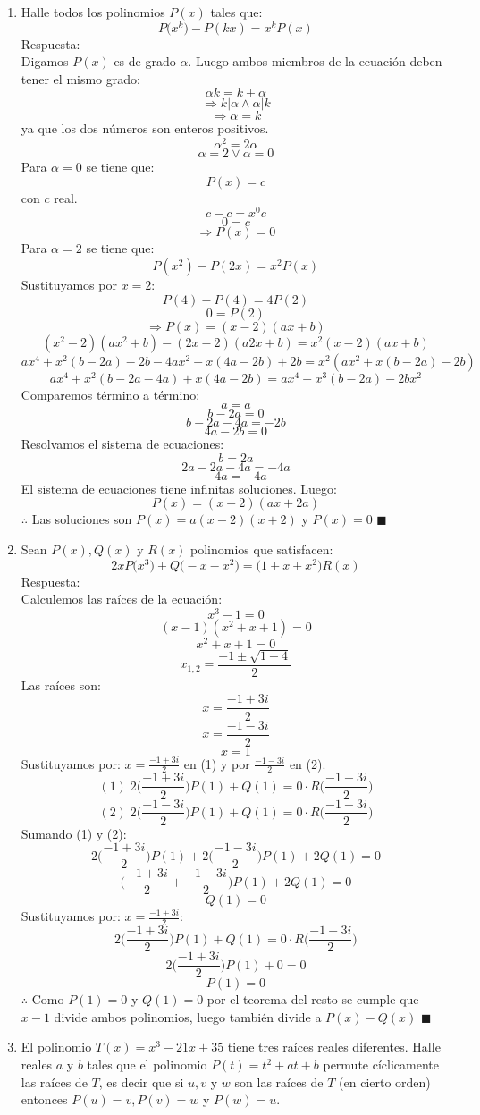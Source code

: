 \documentclass{book}
\begin{document}
\begin{enumerate}
				\item Halle todos los polinomios $P(x)$ tales que: 
			$$P\big(x^k\big)-P(kx)=x^kP(x)$$
			Respuesta:\\
			Digamos $P(x)$ es de grado $\alpha$. Luego ambos miembros de la ecuación deben tener el mismo grado:
$$\alpha k=k+\alpha$$
$$\Rightarrow k|\alpha \wedge \alpha|k$$
$$\Rightarrow\alpha=k $$
ya que los dos números son enteros positivos.
$$\alpha^2=2\alpha$$
$$\alpha=2 \vee \alpha=0$$
Para $\alpha=0$ se tiene que:
$$P(x)=c$$
con $c$ real.
$$c-c=x^0 c$$
$$0=c$$
$$\Rightarrow P(x)=0$$
Para $\alpha=2$ se tiene que:
$$P(x^2 )-P(2x)=x^2 P(x)$$
Sustituyamos por $x=2$:
$$P(4)-P(4)=4P(2)$$
$$0=P(2)$$
$$\Rightarrow P(x)=(x-2)(ax+b)$$
$$(x^2-2)(ax^2+b)-(2x-2)(a2x+b)=x^2 (x-2)(ax+b)$$
$$ax^4+x^2 (b-2a)-2b-4ax^2+x(4a-2b)+2b=x^2 (ax^2+x(b-2a)-2b)$$
$$ax^4+x^2 (b-2a-4a)+x(4a-2b)=ax^4+x^3 (b-2a)-2bx^2$$
Comparemos término a término:
$$a=a$$
$$b-2a=0$$
$$b-2a-4a=-2b$$
$$4a-2b=0$$
Resolvamos el sistema de ecuaciones:
$$b=2a$$
$$2a-2a-4a=-4a$$
$$-4a=-4a$$
El sistema de ecuaciones tiene infinitas soluciones. Luego:
$$P(x)=(x-2)(ax+2a)$$
$\therefore$ Las soluciones son $P(x)=a(x-2)(x+2)$ y $P(x)=0$ $\blacksquare$\\
				\item Sean $P(x),Q(x)$ y $R(x)$ polinomios que satisfacen:
			$$2xP\big(x^3\big)+Q\big(-x-x^2\big)=\big(1+x+x^2\big)R(x)$$
			Respuesta:\\
			Calculemos las raíces de la ecuación: 
$$x^3-1=0$$
$$(x-1)(x^2+x+1)=0$$
$$x^2+x+1=0$$
$$x_{1,2}=\frac{-1\pm\sqrt{1-4}}{2}$$
Las raíces son:
$$x=\frac{-1+3i}{2}$$
$$x=\frac{-1-3i}{2}$$
$$x=1$$
Sustituyamos por:  $\displaystyle{x=\frac{-1+3i}{2}}$ en (1) y por $\displaystyle{\frac{-1-3i}{2}}$ en (2).
$$(1) \;   2\bigg(\frac{-1+3i}{2}\bigg)P(1)+Q(1)=0\cdot R\bigg(\frac{-1+3i}{2}\bigg)$$
$$ (2)\;     2\bigg(\frac{-1-3i}{2}\bigg)P(1)+Q(1)=0\cdot R\bigg(\frac{-1-3i}{2}\bigg)$$
Sumando (1) y (2):
  $$ 2\bigg(\frac{-1+3i}{2}\bigg)P(1)+2\bigg(\frac{-1-3i}{2}\bigg)P(1)+2Q(1)=0$$
 $$ \bigg(\frac{-1+3i}{2}+\frac{-1-3i}{2}\bigg)P(1)+2Q(1)=0$$
$$Q(1)=0$$
Sustituyamos por:  $\displaystyle{x=\frac{-1+3i}{2}}$:
    $$2\bigg(\frac{-1+3i}{2}\bigg)P(1)+Q(1)=0\cdot R \bigg(\frac{-1+3i}{2}\bigg)$$
$$ 2\bigg(\frac{-1+3i}{2}\bigg)P(1)+0=0$$
$$P(1)=0$$
$\therefore$ Como  $P(1)=0$ y $Q(1)=0$ por el teorema del resto se cumple que $x-1$ divide  ambos polinomios, luego también divide a $P(x)-Q(x)$ $\blacksquare$\\
				\item El polinomio $T(x) = x^3 - 21x + 35$ tiene tres raíces reales diferentes. Halle reales $a$ y $b$ tales que el polinomio $P(t) = t^2 + at + b$ permute cíclicamente las raíces de $T$, es decir que si $u,v$ y $w$ son las raíces de $T$ (en cierto orden) entonces $P(u) = v,P(v) = w$ y $P(w) = u$.\\

\end{enumerate}
\end{document}

